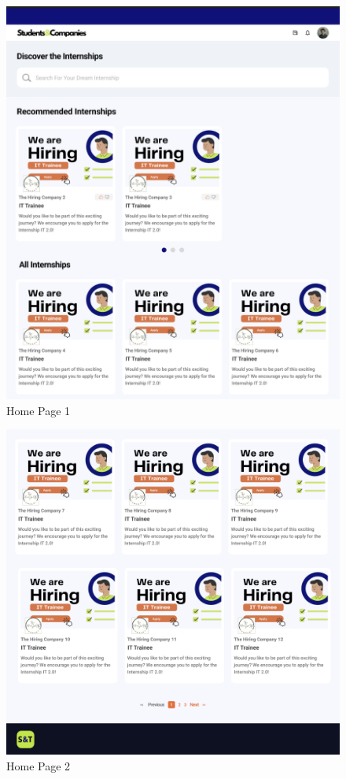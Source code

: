 \documentclass{article}
\begin{document}
    \begin{figure}[H]
    \centering
    \includegraphics[scale = 0.40]{figures/UserInterfaces/HomePage1.png}
    \caption{Home Page 1}
     \centering
\end{figure}

\begin{figure}[H]
    \centering
    \includegraphics[scale = 0.40]{figures/UserInterfaces/HomePage2.png}
    \caption{Home Page 2}
     \centering
\end{figure}
\end{document}
